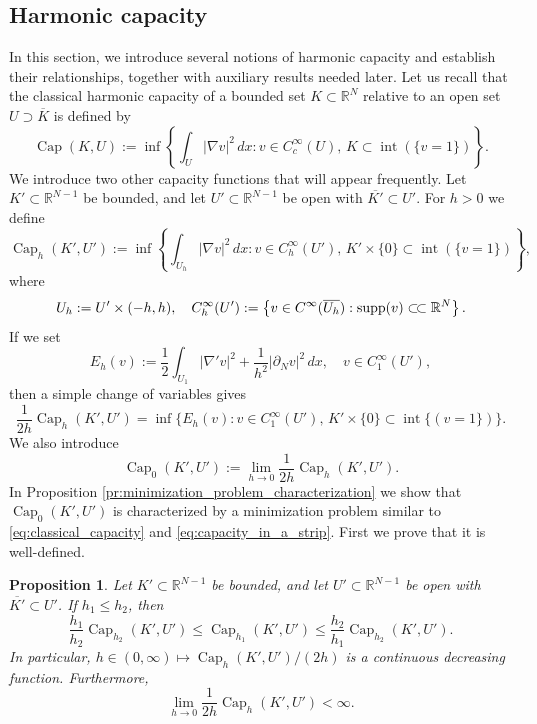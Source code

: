 \documentclass{article}
\numberwithin{equation}{section}
\newtheorem{proposition}[theorem]{Proposition}
\theoremstyle{definition}
\theoremstyle{remark}
\newcommand{\cpct}{\operatorname{Cap}}
\newcommand{\csubset}{\subset\joinrel\subset}
\newcommand{\supp}{\operatorname{supp}}
\newcommand{\topint}{\operatorname{int}}
\begin{document}
\subsection{Harmonic capacity} \label{ssec:harmonic_capacity}
     
In this section, we introduce several notions of harmonic capacity and establish their relationships, together with auxiliary results needed later. Let us recall that the classical harmonic capacity of a bounded set $K \subset \mathbb{R}^N$ relative to an open set $U \supset \overline{K}$ is defined by
\begin{equation} \label{eq:classical_capacity}
    \cpct(K, U) := \inf \left\{\int_U |\nabla v|^2 \, dx : v \in C_c^\infty(U), \, K \subset \topint (\{v = 1\})\right\}.
\end{equation}
We introduce two other capacity functions that will appear frequently. Let $K' \subset \mathbb{R}^{N - 1}$ be bounded, and let $U' \subset \mathbb{R}^{N - 1}$ be open with $\overline{K'} \subset U'$. For $h > 0$ we define
\begin{equation} \label{eq:capacity_in_a_strip}
    \cpct_h(K', U') := \inf \left\{\int_{U_h} |\nabla v|^2 \, dx : v \in C_h^\infty(U'), \, K' \times \{0\} \subset \topint(\{v = 1\})\right\},
\end{equation}
where
\[
U_h := U' \times (-h, h), \quad C_h^\infty(U') := \left\{v \in C^\infty(\overline{U_h}) : \supp(v) \csubset \mathbb{R}^N\right\}.
\]
If we set
\[
E_h(v) := \frac{1}{2} \int_{U_1} |\nabla' v|^2 + \frac{1}{h^2} |\partial_N v|^2 \, dx, \quad v \in C_1^\infty(U'),
\]
then a simple change of variables gives
\begin{equation} \label{eq:capacity_rescaling}
    \frac{1}{2h} \cpct_h(K', U') = \inf \{E_h(v) : v \in C_1^\infty(U'), \, K' \times \{0\} \subset \topint\{(v = 1\})\}.
\end{equation}
We also introduce
\[
\cpct_0(K', U') := \lim_{h \to 0} \frac{1}{2h} \cpct_h(K', U').
\]
In Proposition \ref{pr:minimization_problem_characterization} we show that $\cpct_0(K', U')$ is characterized by a minimization problem similar to \eqref{eq:classical_capacity} and \eqref{eq:capacity_in_a_strip}. First we prove that it is well-defined.

\begin{proposition} \label{pr:continuity_in_h}
    Let $K' \subset \mathbb{R}^{N - 1}$ be bounded, and let $U' \subset \mathbb{R}^{N - 1}$ be open with $\overline{K'} \subset U'$. If $h_1 \le h_2$, then
    \begin{equation} \label{eq:comparison_in_h}
        \frac{h_1}{h_2} \cpct_{h_2}(K', U') \le \cpct_{h_1}(K', U') \le \frac{h_2}{h_1} \cpct_{h_2}(K', U').
    \end{equation}
    In particular, $h \in (0, \infty) \mapsto \cpct_h(K', U')/(2h)$ is a continuous decreasing function. Furthermore,
    \begin{equation} \label{eq:finite_limit}
        \lim_{h \to 0} \frac{1}{2h} \cpct_h(K', U') < \infty.
    \end{equation}
\end{proposition}
\end{document}
